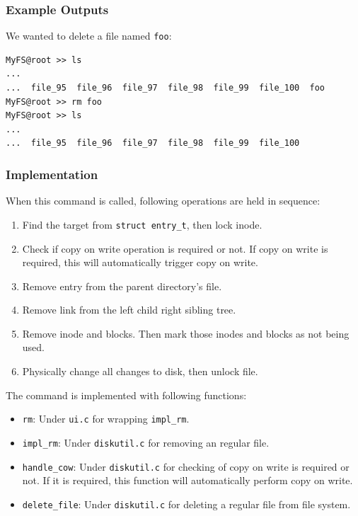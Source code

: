 \documentclass{homework}
\begin{document}
\subsubsection{Example Outputs}
We wanted to delete a file named \texttt{foo}:
\\
\begin{center}
\begin{code}
\begin{verbatim}
MyFS@root >> ls
...
...  file_95  file_96  file_97  file_98  file_99  file_100  foo
MyFS@root >> rm foo
MyFS@root >> ls
...
...  file_95  file_96  file_97  file_98  file_99  file_100 
\end{verbatim}
\end{code}
\end{center}

\subsubsection{Implementation}
When this command is called, following operations are held in sequence:
\begin{enumerate}
    \item Find the target from \texttt{struct entry_t}, then lock inode.
    \item Check if copy on write operation is required or not. If copy on write is required, this will automatically trigger copy on write.
    \item Remove entry from the parent directory's file.
    \item Remove link from the left child right sibling tree.
    \item Remove inode and blocks. Then mark those inodes and blocks as not being used.
    \item Physically change all changes to disk, then unlock file.
\end{enumerate}

The command is implemented with following functions:
\begin{itemize}
    \item \texttt{rm}: Under \texttt{ui.c} for wrapping \texttt{impl_rm}.
    \item \texttt{impl_rm}: Under \texttt{diskutil.c} for removing an regular file.
    \item \texttt{handle_cow}: Under \texttt{diskutil.c} for checking of copy on write is required or not. If it is required, this function will automatically perform copy on write.
    \item \texttt{delete_file}: Under \texttt{diskutil.c} for deleting a regular file from file system.
\end{itemize}
\end{document}
